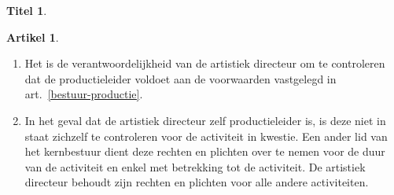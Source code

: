 \documentclass[a4paper,10pt]{article}
\theoremstyle{definition}
\newtheorem{titel}{\newline\Large Titel}
\newtheorem{artikelbase}{\large Artikel}
\newenvironment{artikel}
  {\begin{artikelbase}}
  {\smallskip
   \end{artikelbase}}
\newcommand{\ttextenum}{\mbox{}}
\begin{document}
\begin{titel}

  \begin{artikel}\label{bestuur-vervanging}\ttextenum
    \begin{enumerate}
      \item
        Het is de verantwoordelijkheid van de artistiek directeur om te controleren dat de productieleider voldoet aan de voorwaarden vastgelegd in art.~\ref{bestuur-productie}.
      \item
        In het geval dat de artistiek directeur zelf productieleider is, is deze niet in staat zichzelf te controleren voor de activiteit in kwestie.
        Een ander lid van het kernbestuur dient deze rechten en plichten over te nemen voor de duur van de activiteit en enkel met betrekking tot de activiteit.
        De artistiek directeur behoudt zijn rechten en plichten voor alle andere activiteiten.
    \end{enumerate}
  \end{artikel}

\end{titel}

\end{document}
